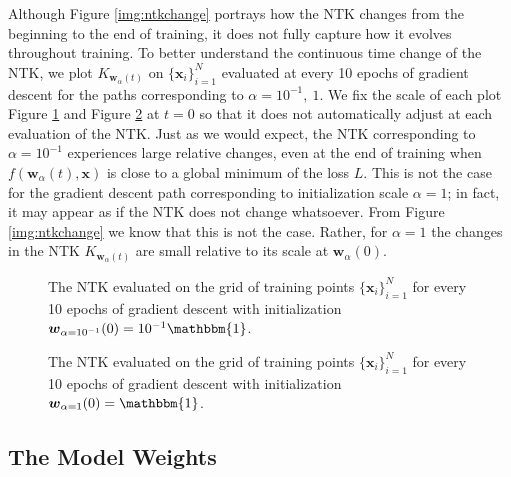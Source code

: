 \documentclass{article}
\begin{document}
Although Figure \ref{img:ntkchange} portrays how the NTK changes from the beginning to the end of training, it does not fully capture how it evolves throughout training. To better understand the continuous time change of the NTK, we plot $K_{\boldsymbol{w}_{\alpha}(t)}$ on $\{ \boldsymbol{x}_i \}_{i=1}^N$ evaluated at every 10 epochs of gradient descent for the paths corresponding to $\alpha = 10^{-1}, \ 1$. We fix the scale of each plot Figure \ref{gif:ntk1} and Figure \ref{gif:ntk2} at $t = 0$ so that it does not automatically adjust at each evaluation of the NTK. Just as we would expect, the NTK corresponding to $\alpha = 10^{-1}$ experiences large relative changes, even at the end of training when $f(\boldsymbol{w}_{\alpha}(t), \boldsymbol{x})$ is close to a global minimum of the loss $L$. This is not the case for the gradient descent path corresponding to initialization scale $\alpha = 1$; in fact, it may appear as if the NTK does not change whatsoever. From Figure \ref{img:ntkchange} we know that this is not the case. Rather, for $\alpha = 1$ the changes in the NTK $K_{\boldsymbol{w}_{\alpha}(t)}$ are small relative to its scale at $\boldsymbol{w}_{\alpha}(0)$.

\begin{figure}[H]
\caption{The NTK evaluated on the grid of training points $\{ \boldsymbol{x}_i \}_{i=1}^N$ for every 10 epochs of gradient descent with initialization $\boldsymbol{w}_{\alpha = 10^{-1}}(0) = 10^{-1}\mathbbm{1}$.}\label{gif:ntk1}
\end{figure}

\newpage

\vspace*{\fill}
\begin{figure}[H]
\caption{The NTK evaluated on the grid of training points $\{ \boldsymbol{x}_i \}_{i=1}^N$ for every 10 epochs of gradient descent with initialization $\boldsymbol{w}_{\alpha = 1}(0) = \mathbbm{1}$.}\label{gif:ntk2}
\end{figure}
\vspace*{\fill}

\newpage

\subsection{The Model Weights}
\end{document}
